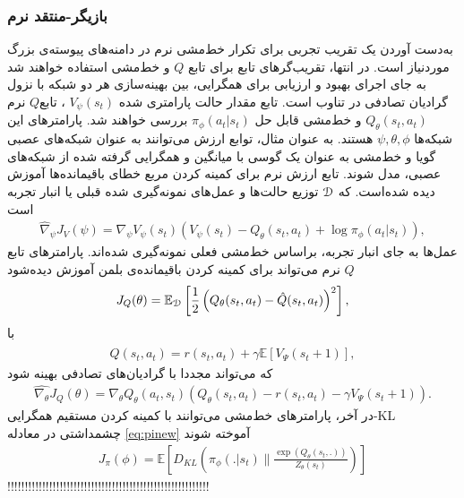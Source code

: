\subsubsection{بازیگر-منتقد نرم}
به‌دست آوردن یک تقریب تجربی برای تکرار خط‌مشی نرم در دامنه‌های پیوسته‌ی بزرگ موردنیاز است.  در انتها، تقریب‌گرهای تابع برای تابع
$ Q$
و خط‌مشی استفاده خواهند شد به جای اجرای بهبود و ارزیابی برای همگرایی، بین بهینه‌سازی هر دو شبکه با نزول گرادیان تصادفی در تناوب است. تابع مقدار حالت پارامتری شده
$V_\psi (s_t)$
، تابع$Q$ نرم 
$Q_\theta (s_t,a_t)$
و خط‌مشی قابل حل 
$\pi_\phi (a_t | s_t)$
بررسی خواهند شد. پارامترهای این شبکه‌ها 
$\psi, \theta, \phi$
هستند. به عنوان مثال، توابع ارزش می‌توانند به عنوان شبکه‌های عصبی گویا و خط‌مشی به عنوان یک گوسی با میانگین و همگرایی گرفته شده از شبکه‌های عصبی، مدل شوند.
تابع ارزش نرم برای کمینه کردن مربع خطای باقیمانده‌ها آموزش دیده شده‌است.
که 
$\EuScript{D}$
توزیع حالت‌ها و عمل‌های نمونه‌گیری شده قبلی یا انبار تجربه
است
\begin{align}
\hat{\nabla}_\psi J_V (\psi) = \nabla_\psi V_\psi (s_t) (V_\psi (s_t)-Q_\theta(s_t,a_t)+\log \pi_\phi (a_t |s_t)) ,
\end{align}
عمل‌ها به جای انبار تجربه، براساس خط‌مشی فعلی نمونه‌گیری شده‌اند. پارامترهای تابع $Q$ نرم می‌تواند برای کمینه کردن باقیمانده‌ی بلمن آموزش دیده‌شود
\begin{align}
J_Q(\theta) = \mathbb{E}_{\EuScript{D}} \left[ \frac{1}{2} \left( Q_\theta (s_t,a_t)- \hat{Q} (s_t,a_t)\right)^2 \right] ,
\end{align}
با 
\begin{align*}
\hat{Q} (s_t,a_t) = r(s_t,a_t) + \gamma \mathbb{E} [V_\Psi (s_t+1)] ,
\end{align*}
که می‌تواند مجددا با گرادیان‌های تصادفی بهینه شود
\begin{align}
\hat{\nabla_{\theta}} J_Q (\theta) = \nabla_\theta Q_\theta (a_t,s_t) \left( Q_\theta (s_t,a_t)- r(s_t,a_t) - \gamma V_\Psi (s_t+1) \right). 
\label{eq:hatnabla}
\end{align}
در آخر، پارامترهای خط‌مشی می‌توانند با کمینه کردن مستقیم همگرایی-KL چشمداشتی در معادله \ref{eq:pinew} آموخته شوند
\begin{align}
J_\pi(\phi) = \mathbb{E}\left[ D_{KL}  \left( \pi_\phi(.|s_t) \parallel \frac{\exp{(Q_{\theta} (s_t,.))}}{Z_{\theta} (s_t)}\right) \right]
\end{align}
!!!!!!!!!!!!!!!!!!!!!!!!!!!!!!!!!!!!!!!!!!!!!!!!!!!!!!!!!!
